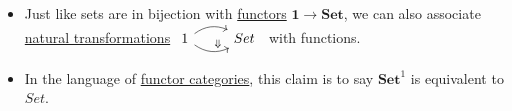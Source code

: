 \begin{itemize}
    \item  Just like sets are in bijection with \hyperref[D3.35]{functors} $\mathbf{1}\rightarrow\mathbf{Set}$, we can also associate \,\hyperref[D3.49]{natural transformations} $\begin{tikzcd}1 \arrow[r, bend left] \arrow[r, "\Downarrow", bend right] & Set\end{tikzcd}$\, with functions.
    \item In the language of \hyperref[D3.54]{functor categories}, this claim is to say $\mathbf{Set}^1$ is equivalent to $Set$.
  \end{itemize}
